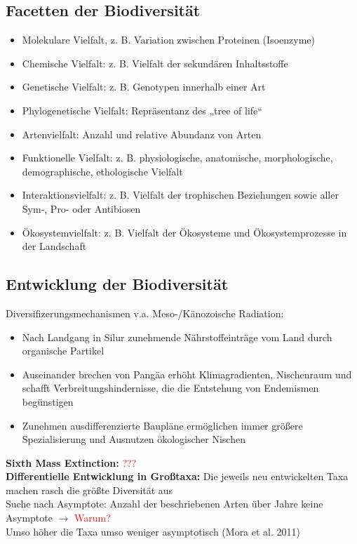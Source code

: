 \subsection{Facetten der Biodiversität}
\begin{itemize}
	\item Molekulare Vielfalt, z. B. Variation zwischen Proteinen (Isoenzyme)
	\item Chemische Vielfalt: z. B. Vielfalt der sekundären Inhaltsstoffe
	\item Genetische Vielfalt: z. B. Genotypen innerhalb einer Art
	\item Phylogenetische Vielfalt: Repräsentanz des „tree of life“
	\item Artenvielfalt: Anzahl und relative Abundanz von Arten
	\item Funktionelle Vielfalt: z. B. physiologische, anatomische, morphologische, demographische, ethologische Vielfalt
	\item Interaktionsvielfalt: z. B. Vielfalt der trophischen Beziehungen sowie aller Sym-, Pro- oder Antibiosen
	\item Ökosystemvielfalt: z. B. Vielfalt der Ökosysteme und Ökosystemprozesse in der Landschaft
\end{itemize}

\subsection{Entwicklung der Biodiversität}
Diversifizerungsmechanismen v.a. Meso-/Känozoische Radiation:
\begin{itemize}
	\item Nach Landgang in Silur zunehmende Nährstoffeinträge vom Land durch organische Partikel
	\item Auseinander brechen von Pangäa erhöht Klimagradienten, Nischenraum und schafft Verbreitungshindernisse, die die Entstehung von Endemismen begünstigen
	\item Zunehmen ausdifferenzierte Baupläne ermöglichen immer größere Spezialisierung und Ausnutzen ökologischer Nischen
\end{itemize}

\textbf{Sixth Mass Extinction:} \textcolor{red}{???}
\\

\textbf{Differentielle Entwicklung in Großtaxa:} Die jeweils neu entwickelten Taxa machen rasch die größte Diversität aus\\
Suche nach Asymptote: Anzahl der beschriebenen Arten über Jahre keine Asymptote $\rightarrow$ \textcolor{red}{Warum?}\\
Umso höher die Taxa umso weniger asymptotisch (Mora et al. 2011)\\

